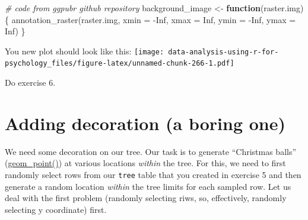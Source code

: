 \documentclass[
]{book}
\newenvironment{Shaded}{\begin{snugshade}}{\end{snugshade}}
\newcommand{\AttributeTok}[1]{\textcolor[rgb]{0.77,0.63,0.00}{#1}}
\newcommand{\CommentTok}[1]{\textcolor[rgb]{0.56,0.35,0.01}{\textit{#1}}}
\newcommand{\ConstantTok}[1]{\textcolor[rgb]{0.00,0.00,0.00}{#1}}
\newcommand{\ControlFlowTok}[1]{\textcolor[rgb]{0.13,0.29,0.53}{\textbf{#1}}}
\newcommand{\FunctionTok}[1]{\textcolor[rgb]{0.00,0.00,0.00}{#1}}
\newcommand{\NormalTok}[1]{#1}
\newcommand{\OtherTok}[1]{\textcolor[rgb]{0.56,0.35,0.01}{#1}}
\newcommand{\SpecialCharTok}[1]{\textcolor[rgb]{0.00,0.00,0.00}{#1}}
\begin{document}
\begin{Shaded}
\begin{Highlighting}[]
\CommentTok{\# code from ggpubr github repository}
\NormalTok{background\_image }\OtherTok{\textless{}{-}} \ControlFlowTok{function}\NormalTok{(raster.img)\{}
  \FunctionTok{annotation\_raster}\NormalTok{(raster.img,}
                    \AttributeTok{xmin =} \SpecialCharTok{{-}}\ConstantTok{Inf}\NormalTok{, }\AttributeTok{xmax =} \ConstantTok{Inf}\NormalTok{,}
                    \AttributeTok{ymin =} \SpecialCharTok{{-}}\ConstantTok{Inf}\NormalTok{, }\AttributeTok{ymax =} \ConstantTok{Inf}\NormalTok{)}
\NormalTok{\}}
\end{Highlighting}
\end{Shaded}

You new plot should look like this:
\texttt{[image: data-analysis-using-r-for-psychology\_files/figure-latex/unnamed-chunk-266-1.pdf]}

Do exercise 6.

\hypertarget{adding-decoration-a-boring-one}{%
\section{Adding decoration (a boring one)}\label{adding-decoration-a-boring-one}}

We need some decoration on our tree. Our task is to generate ``Christmas balls'' (\href{https://ggplot2.tidyverse.org/reference/geom_point.html}{geom\_point()}) at various locations \emph{within} the tree. For this, we need to first randomly select rows from our \texttt{tree} table that you created in exercise 5 and then generate a random location \emph{within} the tree limits for each sampled row. Let us deal with the first problem (randomly selecting riws, so, effectively, randomly selecting y coordinate) first.
\end{document}
